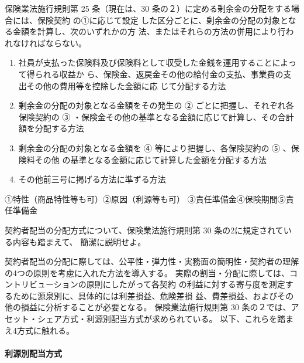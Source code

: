 \documentclass[report,gutter=10mm,fore-edge=10mm,uplatex,dvipdfmx]{jlreq}
\begin{document}
保険業法施行規則第 25 条（現在は、30 条の２）に定める剰余金の分配をする場合には、保険契約
の①に応じて設定 した区分ごとに、剰余金の分配の対象となる金額を計算し、次のいずれかの方
法、またはそれらの方法の併用により行われなければならない。

\begin{enumerate} [1]
 \item 
 社員が支払った保険料及び保険料として収受した金銭を運用することによって得られる収益か
 ら、保険金、返戻金その他の給付金の支払、事業費の支出その他の費用等を控除した金額に応
 じて分配する方法
 \item 
 剰余金の分配の対象となる金額をその発生の ② ごとに把握し、それぞれ各保険契約の
 ③ ・保険金その他の基準となる金額に応じて計算し、その合計額を分配する方法
 \item 
 剰余金の分配の対象となる金額を ④ 等により把握し、各保険契約の
 ⑤ 、保険料その他 の基準となる金額に応じて計算した金額を分配する方法
 \item 
 その他前三号に掲げる方法に準ずる方法
\end{enumerate}

①特性（商品特性等も可）②原因（利源等も可）
③責任準備金④保険期間⑤責任準備金


 契約者配当の分配方式について、保険業法施行規則第 30 条の2に規定されている内容も踏まえて、
 簡潔に説明せよ。


契約者配当の分配に際しては、公平性・弾力性・実務面の簡明性・契約者の理解の4つの原則を考慮に入れた方法を導入する。
実際の割当・分配に際しては、コントリビューションの原則にしたがって各契約
の利益に対する寄与度を測定するために源泉別に、具体的には利差損益、危険差損
益、費差損益、およびその他の損益に分析することが必要となる。
保険業法施行規則第 30 条の２では、アセット・シェア方式・利源別配当方式が求められている。
以下、これらを踏まえ4方式に触れる。

\paragraph{利源別配当方式}
\end{document}
